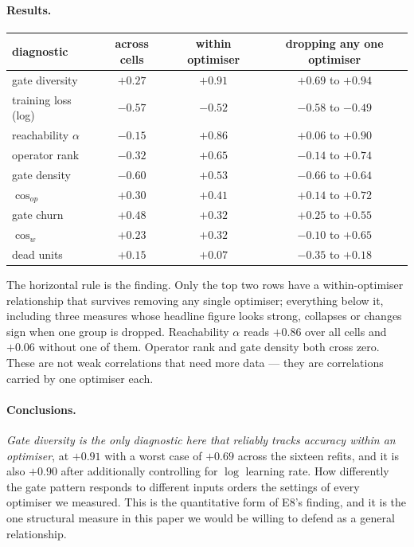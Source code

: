\documentclass{article} %
\theoremstyle{plain}
\theoremstyle{definition}
\theoremstyle{remark}
\begin{document}
\paragraph{Results.}

\begin{center}\small
\begin{tabular}{lccc}
\toprule
diagnostic & across cells & within optimiser & dropping any one optimiser \\
\midrule
gate diversity        & $+0.27$ & $\mathbf{+0.91}$ & $+0.69$ to $+0.94$ \\
training loss (log)   & $-0.57$ & $-0.52$ & $-0.58$ to $-0.49$ \\
\midrule
reachability $\alpha$ & $-0.15$ & $+0.86$ & $+0.06$ to $+0.90$ \\
operator rank         & $-0.32$ & $+0.65$ & $-0.14$ to $+0.74$ \\
gate density          & $-0.60$ & $+0.53$ & $-0.66$ to $+0.64$ \\
$\cos_{op}$           & $+0.30$ & $+0.41$ & $+0.14$ to $+0.72$ \\
gate churn            & $+0.48$ & $+0.32$ & $+0.25$ to $+0.55$ \\
$\cos_w$              & $+0.23$ & $+0.32$ & $-0.10$ to $+0.65$ \\
dead units            & $+0.15$ & $+0.07$ & $-0.35$ to $+0.18$ \\
\bottomrule
\end{tabular}
\end{center}

\noindent The horizontal rule is the finding. Only the top two rows have a within-optimiser
relationship that survives removing any single optimiser; everything below it, including three
measures whose headline figure looks strong, collapses or changes sign when one group is dropped.
Reachability $\alpha$ reads $+0.86$ over all cells and $+0.06$ without one of them. Operator rank
and gate density both cross zero. These are not weak correlations that need more data --- they are
correlations carried by one optimiser each.

\paragraph{Conclusions.}
\emph{Gate diversity is the only diagnostic here that reliably tracks accuracy within an
optimiser}, at $+0.91$ with a worst case of $+0.69$ across the sixteen refits, and it is also
$+0.90$ after additionally controlling for $\log$ learning rate. How differently the gate pattern
responds to different inputs orders the settings of every optimiser we measured. This is the
quantitative form of E8's finding, and it is the one structural measure in this paper we would be
willing to defend as a general relationship.
\end{document}
